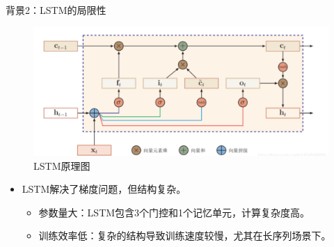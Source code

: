 \begin{frame}{背景2：LSTM的局限性}
    \begin{figure}
        \centering
        \includegraphics[width=0.65\linewidth]{pic/LSTM原理图.png}
        \caption{LSTM原理图}
        \label{fig:LSTM}
    \end{figure}
    \begin{itemize}
        \item LSTM解决了梯度问题，但结构复杂。
        \begin{itemize}
            \item 参数量大：LSTM包含3个门控和1个记忆单元，计算复杂度高。
            \item 训练效率低：复杂的结构导致训练速度较慢，尤其在长序列场景下。
        \end{itemize}
    \end{itemize}
\end{frame}





